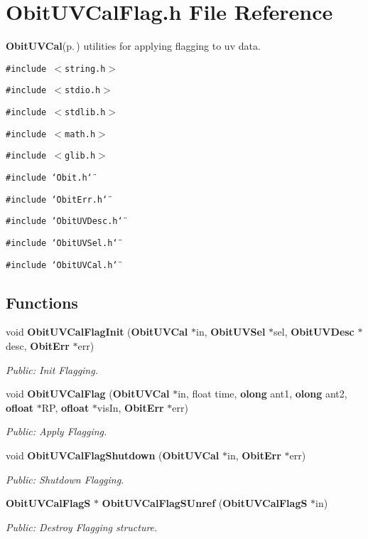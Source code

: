\section{Obit\-UVCal\-Flag.h File Reference}
\label{ObitUVCalFlag_8h}
{\bf Obit\-UVCal}{\rm (p.\,\pageref{structObitUVCal})} utilities for applying flagging to uv data. 

{\tt \#include $<$string.h$>$}\par
{\tt \#include $<$stdio.h$>$}\par
{\tt \#include $<$stdlib.h$>$}\par
{\tt \#include $<$math.h$>$}\par
{\tt \#include $<$glib.h$>$}\par
{\tt \#include \char`\"{}Obit.h\char`\"{}}\par
{\tt \#include \char`\"{}Obit\-Err.h\char`\"{}}\par
{\tt \#include \char`\"{}Obit\-UVDesc.h\char`\"{}}\par
{\tt \#include \char`\"{}Obit\-UVSel.h\char`\"{}}\par
{\tt \#include \char`\"{}Obit\-UVCal.h\char`\"{}}\par
\subsection*{Functions}
\begin{CompactItemize}
\item 
void {\bf Obit\-UVCal\-Flag\-Init} ({\bf Obit\-UVCal} $\ast$in, {\bf Obit\-UVSel} $\ast$sel, {\bf Obit\-UVDesc} $\ast$desc, {\bf Obit\-Err} $\ast$err)
\begin{CompactList}\small\item\em Public: Init Flagging. \item\end{CompactList}\item 
void {\bf Obit\-UVCal\-Flag} ({\bf Obit\-UVCal} $\ast$in, float time, {\bf olong} ant1, {\bf olong} ant2, {\bf ofloat} $\ast$RP, {\bf ofloat} $\ast$vis\-In, {\bf Obit\-Err} $\ast$err)
\begin{CompactList}\small\item\em Public: Apply Flagging. \item\end{CompactList}\item 
void {\bf Obit\-UVCal\-Flag\-Shutdown} ({\bf Obit\-UVCal} $\ast$in, {\bf Obit\-Err} $\ast$err)
\begin{CompactList}\small\item\em Public: Shutdown Flagging. \item\end{CompactList}\item 
{\bf Obit\-UVCal\-Flag\-S} $\ast$ {\bf Obit\-UVCal\-Flag\-SUnref} ({\bf Obit\-UVCal\-Flag\-S} $\ast$in)
\begin{CompactList}\small\item\em Public: Destroy Flagging structure. \item\end{CompactList}\end{CompactItemize}



